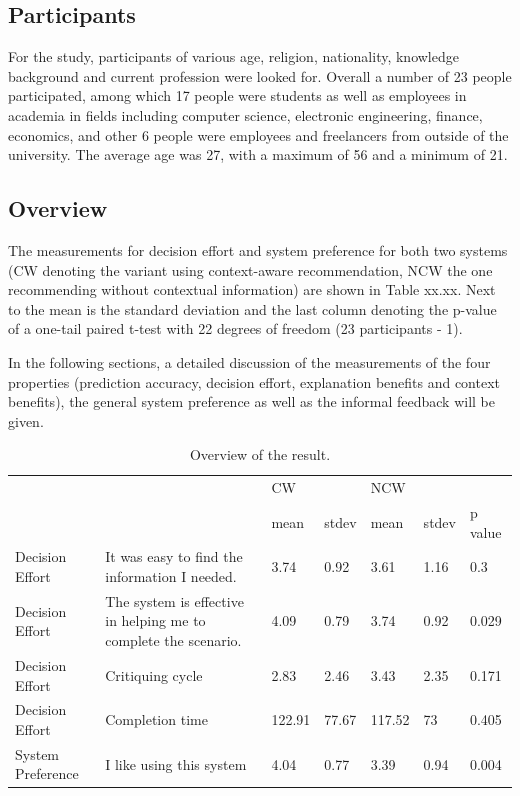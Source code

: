 \subsection{Participants} \label{sec:results_p}

For the study, participants of various age, religion, nationality, knowledge background and current profession were looked for. Overall a number of 23 people participated, among which 17 people were students as well as employees in academia in fields including computer science, electronic engineering, finance, economics, and other 6 people were employees and freelancers from outside of the university. The average age was 27, with a maximum of 56 and a minimum of 21.

\subsection{Overview} \label{sec:results_o}

The measurements for decision effort and system preference for both two systems (CW denoting the variant using context-aware recommendation, NCW the one recommending without contextual information) are shown in Table xx.xx. Next to the mean is the standard deviation and the last column denoting the p-value of a one-tail paired t-test with 22 degrees of freedom (23 participants - 1).

In the following sections, a detailed discussion of the measurements of the four properties (prediction accuracy, decision effort, explanation benefits and context benefits), the general system preference as well as the informal feedback will be given.

\begin{table}[H]
	\centering
	\caption{Overview of the result.}
	\label{tab:overview}
	\begin{tabular}{p{0.7in}p{1.2in}p{0.5in}p{0.5in}p{0.5in}p{0.5in}p{0.5in}}
		 &  & CW &  & NCW \\ 
 		 &  & mean & stdev & mean & stdev & p value \\ \hline
		 Decision Effort & It was easy to find the information I needed. & 3.74 & 0.92 & 3.61 & 1.16 & 0.3 \\ 
		Decision Effort & The system is effective in helping me to complete the scenario. & 4.09 & 0.79 & 3.74 & 0.92 & 0.029 \\ 
		Decision Effort & Critiquing cycle & 2.83 & 2.46 & 3.43 & 2.35 & 0.171 \\ 
		Decision Effort & Completion time & 122.91 & 77.67 & 117.52 & 73 & 0.405 \\ 
		System Preference & I like using this system & 4.04 & 0.77 & 3.39 & 0.94 & 0.004 \\ \hline
	\end{tabular}
\end{table}

